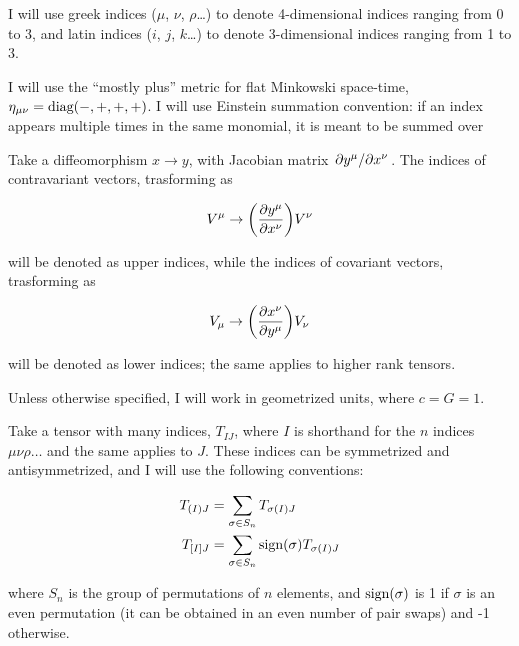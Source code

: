 I will use greek indices ($\mu$, $\nu$, $\rho$\dots) to denote 4-dimensional indices ranging from 0 to 3, and latin indices ($i$, $j$, $k$\dots) to denote 3-dimensional indices ranging from 1 to 3.

I will use the ``mostly plus'' metric for flat Minkowski space-time, $\eta_{\mu \nu} = \text{diag}\qty(-, +, +, +)$.
I will use Einstein summation convention: if an index appears multiple times in the same monomial, it is meant to be summed over

Take a diffeomorphism $x \rightarrow y$, with Jacobian matrix $\pdv*{y^\mu}{x^\nu}$.
The indices of contravariant vectors, trasforming as

\begin{equation}
    V^\mu \rightarrow \qty( \pdv{y^\mu}{x^\nu})  V^\nu
\end{equation}

will be denoted as upper indices, while the indices of covariant vectors, trasforming as

\begin{equation}
V_\mu \rightarrow \qty( \pdv{x^\nu}{y^\mu})  V_\nu
\end{equation}

will be denoted as lower indices; the same applies to higher rank tensors.

Unless otherwise specified, I will work in geometrized units, where $c = G = 1$.

Take a tensor with many indices, $T_{IJ}$, where $I$ is shorthand for the $n$ indices $\mu \nu \rho \dots$ and the same applies to $J$. These indices can be symmetrized and antisymmetrized, and I will use the following conventions:

\begin{align}
    T_{(I)J} &= \sum_{\sigma \in S_n} T_{\sigma(I)J} \\
    T_{[I]J} &= \sum_{\sigma \in S_n} \text{sign}\qty(\sigma) T_{\sigma(I)J} 
\end{align}

where $S_n$ is the group of permutations of $n$ elements, and $\text{sign}\qty(\sigma)$ is 1 if $\sigma$ is an even permutation (it can be obtained in an even number of pair swaps) and -1 otherwise.
